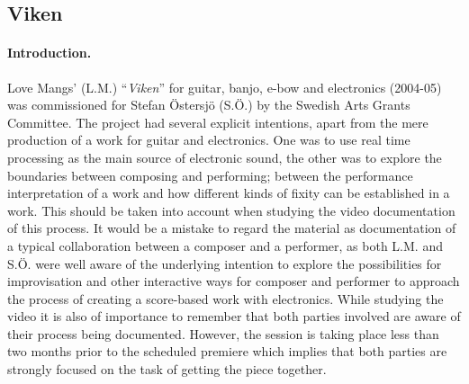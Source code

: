 \documentclass[10pt,letterpaper]{article}
\begin{document}
%
%
%
%
%


\subsection{Viken} \label{viken}
\paragraph{Introduction.}

Love Mangs' (L.M.) ``\emph{Viken}'' for guitar, banjo, e-bow and electronics (2004-05) was
commissioned for Stefan \"{O}ster\-sj\"{o} (S.\"{O}.) by the Swedish Arts Grants
Committee. The project had several explicit intentions, apart from the
mere production of a work for guitar and electronics. One was to use
real time processing as the main source of electronic sound, the other
was to explore the boundaries between composing and performing; between
the performance interpretation of a work and how different kinds of
fixity can be established in a work. This should be taken into account
when studying the video documentation of this process. It would be a
mistake to regard the material as documentation of a typical
collaboration between a composer and a performer, as both L.M. and
S.{\"O}. were well aware of the underlying intention to explore the
possibilities for improvisation and other interactive ways for composer
and performer to approach the process of creating a score-based work
with electronics. While studying the video it is also of importance to
remember that both parties involved are aware of their process being
documented. However, the session is taking place less than two months
prior to the scheduled premiere which implies that both parties are
strongly focused on the task of getting the piece together.
\end{document}
